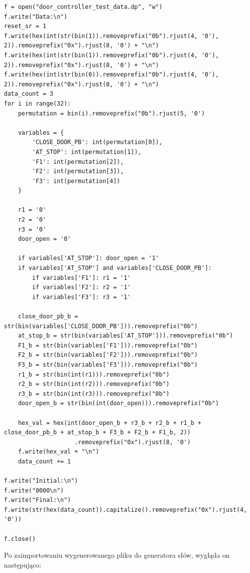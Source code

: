 \documentclass[a4paper]{article}
\begin{document}
\begin{verbatim}
f = open("door_controller_test_data.dp", "w")
f.write("Data:\n")
reset_sr = 1
f.write(hex(int(str(bin(1)).removeprefix("0b").rjust(4, '0'), 2)).removeprefix("0x").rjust(8, '0') + "\n")
f.write(hex(int(str(bin(1)).removeprefix("0b").rjust(4, '0'), 2)).removeprefix("0x").rjust(8, '0') + "\n")
f.write(hex(int(str(bin(0)).removeprefix("0b").rjust(4, '0'), 2)).removeprefix("0x").rjust(8, '0') + "\n")
data_count = 3
for i in range(32):
    permutation = bin(i).removeprefix("0b").rjust(5, '0')
    
    variables = {
        'CLOSE_DOOR_PB': int(permutation[0]),
        'AT_STOP': int(permutation[1]),
        'F1': int(permutation[2]),
        'F2': int(permutation[3]),
        'F3': int(permutation[4])
    }

    r1 = '0'
    r2 = '0'
    r3 = '0'
    door_open = '0'

    if variables['AT_STOP']: door_open = '1'
    if variables['AT_STOP'] and variables['CLOSE_DOOR_PB']:
        if variables['F1']: r1 = '1'
        if variables['F2']: r2 = '1'
        if variables['F3']: r3 = '1'

    close_door_pb_b = str(bin(variables['CLOSE_DOOR_PB'])).removeprefix("0b")
    at_stop_b = str(bin(variables['AT_STOP'])).removeprefix("0b")
    F1_b = str(bin(variables['F1'])).removeprefix("0b")
    F2_b = str(bin(variables['F2'])).removeprefix("0b")
    F3_b = str(bin(variables['F3'])).removeprefix("0b")
    r1_b = str(bin(int(r1))).removeprefix("0b")
    r2_b = str(bin(int(r2))).removeprefix("0b")
    r3_b = str(bin(int(r3))).removeprefix("0b")
    door_open_b = str(bin(int(door_open))).removeprefix("0b")

    hex_val = hex(int(door_open_b + r3_b + r2_b + r1_b + close_door_pb_b + at_stop_b + F3_b + F2_b + F1_b, 2))
                    .removeprefix("0x").rjust(8, '0')
    f.write(hex_val + "\n")
    data_count += 1

f.write("Initial:\n")
f.write("0000\n")
f.write("Final:\n")
f.write(str(hex(data_count)).capitalize().removeprefix("0x").rjust(4, '0'))

f.close()
\end{verbatim}

Po zaimportowaniu wygenerowanego pliku do generatora słów, wygląda on następująco:
\end{document}
